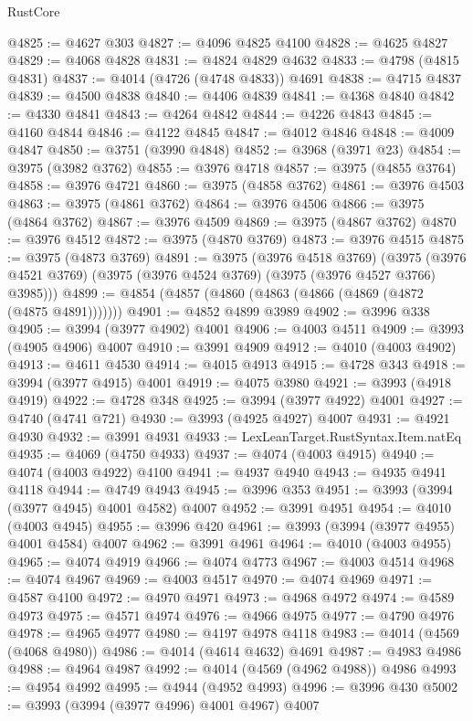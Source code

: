 \begin{lexlean}{RustCore}
\begin{coremodule}
@4825 := @4627 @303
@4827 := @4096 @4825 @4100
@4828 := @4625 @4827
@4829 := @4068 @4828
@4831 := @4824 @4829 @4632
@4833 := @4798 (@4815 @4831)
@4837 := @4014 (@4726 (@4748 @4833)) @4691
@4838 := @4715 @4837
@4839 := @4500 @4838
@4840 := @4406 @4839
@4841 := @4368 @4840
@4842 := @4330 @4841
@4843 := @4264 @4842
@4844 := @4226 @4843
@4845 := @4160 @4844
@4846 := @4122 @4845
@4847 := @4012 @4846
@4848 := @4009 @4847
@4850 := @3751 (@3990 @4848)
@4852 := @3968 (@3971 @23)
@4854 := @3975 (@3982 @3762)
@4855 := @3976 @4718
@4857 := @3975 (@4855 @3764)
@4858 := @3976 @4721
@4860 := @3975 (@4858 @3762)
@4861 := @3976 @4503
@4863 := @3975 (@4861 @3762)
@4864 := @3976 @4506
@4866 := @3975 (@4864 @3762)
@4867 := @3976 @4509
@4869 := @3975 (@4867 @3762)
@4870 := @3976 @4512
@4872 := @3975 (@4870 @3769)
@4873 := @3976 @4515
@4875 := @3975 (@4873 @3769)
@4891 := @3975
    (@3976 @4518 @3769)
    (@3975 (@3976 @4521 @3769) (@3975 (@3976 @4524 @3769) (@3975 (@3976 @4527 @3766) @3985)))
@4899 := @4854 (@4857 (@4860 (@4863 (@4866 (@4869 (@4872 (@4875 @4891)))))))
@4901 := @4852 @4899 @3989
@4902 := @3996 @338
@4905 := @3994 (@3977 @4902) @4001
@4906 := @4003 @4511
@4909 := @3993 (@4905 @4906) @4007
@4910 := @3991 @4909
@4912 := @4010 (@4003 @4902)
@4913 := @4611 @4530
@4914 := @4015 @4913
@4915 := @4728 @343
@4918 := @3994 (@3977 @4915) @4001
@4919 := @4075 @3980
@4921 := @3993 (@4918 @4919)
@4922 := @4728 @348
@4925 := @3994 (@3977 @4922) @4001
@4927 := @4740 (@4741 @721)
@4930 := @3993 (@4925 @4927) @4007
@4931 := @4921 @4930
@4932 := @3991 @4931
@4933 := LexLeanTarget.RustSyntax.Item.natEq
@4935 := @4069 (@4750 @4933)
@4937 := @4074 (@4003 @4915)
@4940 := @4074 (@4003 @4922) @4100
@4941 := @4937 @4940
@4943 := @4935 @4941 @4118
@4944 := @4749 @4943
@4945 := @3996 @353
@4951 := @3993 (@3994 (@3977 @4945) @4001 @4582) @4007
@4952 := @3991 @4951
@4954 := @4010 (@4003 @4945)
@4955 := @3996 @420
@4961 := @3993 (@3994 (@3977 @4955) @4001 @4584) @4007
@4962 := @3991 @4961
@4964 := @4010 (@4003 @4955)
@4965 := @4074 @4919
@4966 := @4074 @4773
@4967 := @4003 @4514
@4968 := @4074 @4967
@4969 := @4003 @4517
@4970 := @4074 @4969
@4971 := @4587 @4100
@4972 := @4970 @4971
@4973 := @4968 @4972
@4974 := @4589 @4973
@4975 := @4571 @4974
@4976 := @4966 @4975
@4977 := @4790 @4976
@4978 := @4965 @4977
@4980 := @4197 @4978 @4118
@4983 := @4014 (@4569 (@4068 @4980))
@4986 := @4014 (@4614 @4632) @4691
@4987 := @4983 @4986
@4988 := @4964 @4987
@4992 := @4014 (@4569 (@4962 @4988)) @4986
@4993 := @4954 @4992
@4995 := @4944 (@4952 @4993)
@4996 := @3996 @430
@5002 := @3993 (@3994 (@3977 @4996) @4001 @4967) @4007

\end{coremodule}
\end{lexlean}
